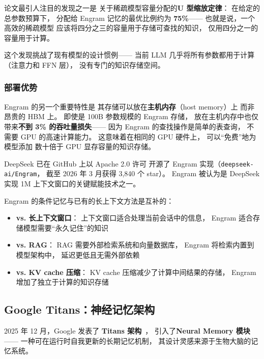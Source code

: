论文最引人注目的发现之一是
关于稀疏模型容量分配的\textbf{U 型缩放定律}：
在给定的总参数预算下，
分配给 Engram 记忆的最优比例约为 \textbf{75\%}——
也就是说，一个高效的稀疏模型
应该将四分之三的容量用于存储可查找的知识，
仅用四分之一的容量用于计算。

这个发现挑战了现有模型的设计惯例——
当前 LLM 几乎将所有参数都用于计算
（注意力和 FFN 层），
没有专门的知识存储空间。

\subsubsection{部署优势}

Engram 的另一个重要特性是
其存储可以放在\textbf{主机内存}（host memory）上
而非昂贵的 HBM 上。
即使是 100B 参数规模的 Engram 存储，
放在主机内存中也仅带来\textbf{不到 3\% 的吞吐量损失}——
因为 Engram 的查找操作是简单的表查询，
不需要 GPU 的高速计算能力。
这意味着在相同的 GPU 硬件上，
可以``免费''地为模型添加
数十倍于 GPU 显存容量的知识存储。

DeepSeek 已在 GitHub 上以 Apache 2.0 许可
开源了 Engram 实现（\texttt{deepseek-ai/Engram}，
截至 2026 年 3 月获得 3,840 个 star）。
Engram 被认为是
DeepSeek 实现 1M 上下文窗口的关键赋能技术之一。

\begin{keybox}
Engram 的条件记忆与已有的长上下文方法是互补的：
\begin{itemize}[noitemsep]
  \item \textbf{vs. 长上下文窗口}：
        上下文窗口适合处理当前会话中的信息，
        Engram 适合存储模型需要``永久记住''的知识
  \item \textbf{vs. RAG}：
        RAG 需要外部检索系统和向量数据库，
        Engram 将检索内置到模型架构中，
        延迟更低且无需外部依赖
  \item \textbf{vs. KV cache 压缩}：
        KV cache 压缩减少了计算中间结果的存储，
        Engram 增加了独立于计算的知识存储
\end{itemize}
\end{keybox}

\subsection{Google Titans：神经记忆架构}

2025 年 12 月，Google 发表了
\textbf{Titans 架构}~\cite{titans2025}，
引入了\textbf{Neural Memory 模块}——
一种可在运行时自我更新的长期记忆机制，
其设计灵感来源于生物大脑的记忆系统。

